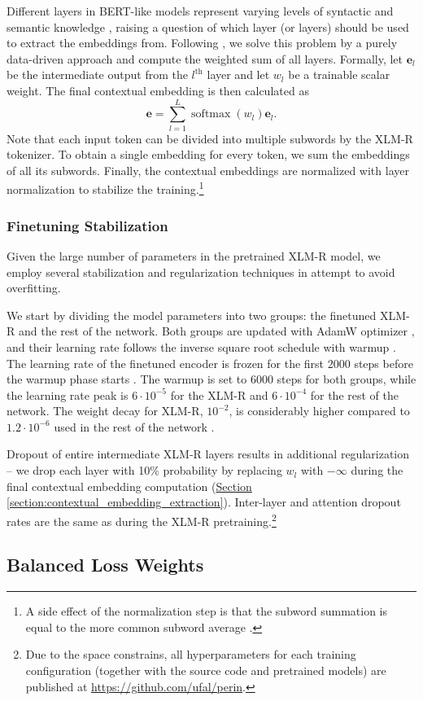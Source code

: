 \documentclass[11pt,a4paper]{article}
\newcommand{\secref}[1]{\hyperref[#1]{Section \ref*{#1}}}
\begin{document}
Different layers in BERT-like models represent varying levels of syntactic and semantic knowledge \cite{van2019does}, raising a question of which layer (or layers) should be used to extract the embeddings from. Following \citet{kondratyuk201975}, we solve this problem by a purely data-driven approach and compute the weighted sum of all layers. Formally, let $\textbf{e}_l$ be the intermediate output from the $l^\textrm{th}$ layer and let $w_l$ be a trainable scalar weight. The final contextual embedding is then calculated as
$$\textbf{e} = \sum_{l=1}^{L}{\operatorname{softmax}(w_l)\textbf{e}_l}.$$
Note that each input token can be divided into multiple subwords by the XLM-R tokenizer. To obtain a single embedding for every token, we sum the embeddings of all its subwords. Finally, the contextual embeddings are normalized with layer normalization \cite{ba2016layer} to stabilize the training.\nobreak\hspace{-.08em}\footnote{A side effect of the normalization step is that the subword summation is equal to the more common subword average \cite{zhang2019amr}.}

\subsubsection{Finetuning Stabilization}

Given the large number of parameters in the pretrained XLM-R model, we employ several stabilization and regularization techniques in attempt to avoid overfitting.

We start by dividing the model parameters into two groups: the finetuned XLM-R and the rest of the network. Both groups are updated with AdamW optimizer \cite{loshchilov2017decoupled} 
, and their learning rate follows the inverse square root schedule with warmup \cite{vaswani2017attention}.
The learning rate of the finetuned encoder is frozen for the first 2000 steps before the warmup phase starts \cite{howard2018universal}. The warmup is set to 6000 steps for both groups, while the learning rate peak is $6 \cdot 10^{-5}$ for the XLM-R and $6 \cdot 10^{-4}$ for the rest of the network. The weight decay for XLM-R, $10^{-2}$, is considerably higher compared to $1.2 \cdot 10^{-6}$ used in the rest of the network \cite{devlin2018bert}.

Dropout of entire intermediate XLM-R layers results in additional regularization -- we drop each layer with 10\% probability by replacing $w_l$ with $-\infty$ during the final contextual embedding computation (\secref{section:contextual_embedding_extraction}). Inter-layer and attention dropout rates are the same as during the XLM-R pretraining.\hspace{-.08em}\footnote{Due to the space constrains, all hyperparameters for each training configuration (together with the source code and pretrained models) are published at \url{https://github.com/ufal/perin}.} \subsection{Balanced Loss Weights}
\end{document}
